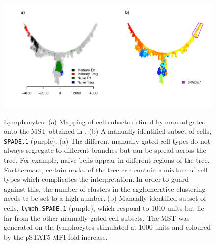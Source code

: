 \begin{figure}
\centering
\begin{minipage}{\textwidth}
\includegraphics[width=\linewidth]{figures/spade-lymphocytes-celltypes}
\end{minipage}
{ Lymphocytes: (a) Mapping of cell subsets defined by manual gates onto the \gls{MST} obtained in .  (b) A manually identified subset of cells, \texttt{SPADE.1} (purple). }
{ (a)
The different manually gated cell types do not always segregate to different branches but can be spread across the tree.
For example, naive Teffs appear in different regions of the tree.
Furthermore, certain nodes of the tree can contain a mixture of cell types which complicates the interpretation.
In order to guard against this, the number of clusters in the agglomerative clustering needs to be set to a high number.
(b)
Manually identified subset of cells, \texttt{lymph.SPADE.1} (purple), which respond to 1000 units but lie far from the other manually gated cell subsets.
The \gls{MST} was generated on the lymphocytes stimulated at 1000 units and coloured by the pSTAT5 MFI fold increase.
}
\end{figure}


